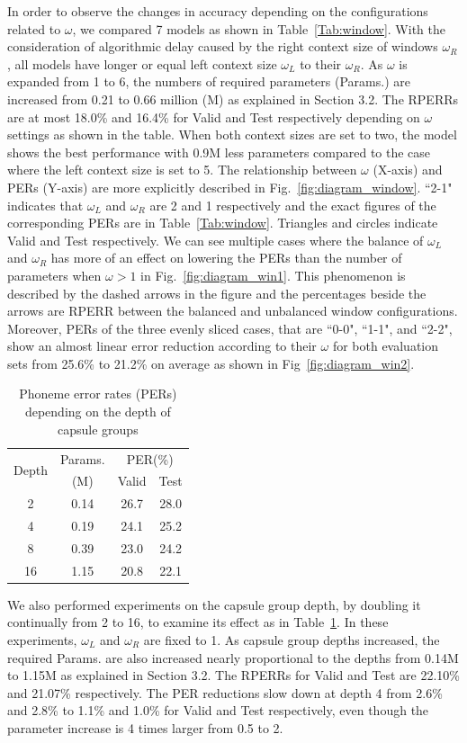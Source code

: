 \documentclass[review]{elsarticle}
\begin{document}
In order to observe the changes in accuracy depending on the configurations related to $\omega$, we compared 7 models as shown in Table~\ref{Tab:window}.
With the consideration of algorithmic delay caused by the right context size of windows $\omega_R$, all models have longer or equal left context size $\omega_L$ to their $\omega_R$.
As $\omega$ is expanded from 1 to 6, the numbers of required parameters (Params.) are increased from 0.21 to 0.66 million (M) as explained in  Section 3.2.
The RPERRs are at most 18.0\% and 16.4\% for Valid and Test respectively depending on $\omega$ settings as shown in the table.
When both context sizes are set to two, the model shows the best performance with 0.9M less parameters compared to the case where the left context size is set to 5.
The relationship between $\omega$ (X-axis) and PERs (Y-axis) are more explicitly described in Fig.~\ref{fig:diagram_window}.
``2-1" indicates that $\omega_L$ and $\omega_R$ are 2 and 1 respectively and the exact figures of the corresponding PERs are in Table~\ref{Tab:window}.
Triangles and circles indicate Valid and Test respectively.
We can see multiple cases where the balance of $\omega_L$ and $\omega_R$ has more of an effect on lowering the PERs than the number of parameters when $\omega > 1$ in Fig.~\ref{fig:diagram_win1}.
This phenomenon is described by the dashed arrows in the figure and the percentages beside the arrows are RPERR between the balanced and unbalanced window configurations.
Moreover, PERs of the three evenly sliced cases, that are ``0-0", ``1-1", and ``2-2", show an almost linear error reduction according to their $\omega$ for both evaluation sets from 25.6\% to 21.2\% on average as shown in Fig~\ref{fig:diagram_win2}.

\begin{table}[]
\centering
\begin{tabular}{cccc}
\multirow{2}{*}{Depth} & Params. & \multicolumn{2}{c}{PER(\%)} \\ 
                       & (M)     & Valid & Test \\\hline
2 & 0.14 & 26.7 & 28.0 \\
4 & 0.19 & 24.1 & 25.2 \\
8 & 0.39 & 23.0 & 24.2 \\
16 & 1.15 & 20.8 & 22.1
\end{tabular}
\caption{Phoneme error rates (PERs) depending on the depth of capsule groups}%
\label{Tab:depth}
\end{table}

We also performed experiments on the capsule group depth, by doubling it continually from 2 to 16, to examine its effect as in Table~\ref{Tab:depth}.
In these experiments, $\omega_L$ and $\omega_R$ are fixed to 1.
As capsule group depths increased, the required Params. are also increased nearly proportional to the depths from 0.14M to 1.15M as explained in Section 3.2.
The RPERRs for Valid and Test are 22.10\% and 21.07\% respectively.
The PER reductions slow down at depth 4 from 2.6\% and 2.8\% to 1.1\% and 1.0\% for Valid and Test respectively, even though the parameter increase is 4 times larger from 0.5 to 2.
\end{document}
